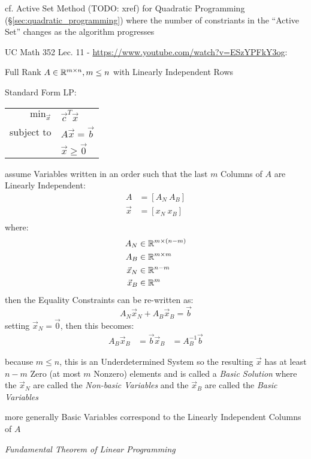 cf. Active Set Method (TODO: xref) for Quadratic Programming
(\S\ref{sec:quadratic_programming}) where the number of constriants in the
``Active Set'' changes as the algorithm progresses

UC Math 352 Lec. 11 - \url{https://www.youtube.com/watch?v=ESzYPFkY3og}:

Full Rank $A \in \mathbb{R}^{m \times n}, m \leq n$ with Linearly Independent Rows

Standard Form LP:

\begin{tabular}{r l}
  $\mathrm{min}_{\vec{x}}$ & $\vec{c}^T\vec{x}$     \\
  subject to               & $A\vec{x} = \vec{b}$   \\
                           & $\vec{x} \geq \vec{0}$ \\
\end{tabular}

assume Variables written in an order such that the last $m$ Columns of $A$ are
Linearly Independent:
\begin{align*}
  A       & = [A_N \ A_B] \\
  \vec{x} & = [x_N \ x_B] \\
\end{align*}
where:
\begin{align*}
  A_N       & \in \mathbb{R}^{m \times (n - m)} \\
  A_B       & \in \mathbb{R}^{m \times m} \\
  \vec{x}_N & \in \mathbb{R}^{n-m} \\
  \vec{x}_B & \in \mathbb{R}^m \\
\end{align*}
then the Equality Constraints can be re-written as:
\[
  A_N\vec{x}_N + A_B\vec{x}_B = \vec{b}
\]
setting $\vec{x}_N = \vec{0}$, then this becomes:
\begin{align*}
  A_B\vec{x}_B & = \vec{b}
  \vec{x}_B    & = A_B^{-1}\vec{b}
\end{align*}

because $m \leq n$, this is an Underdetermined System so the resulting
$\vec{x}$ has at least $n - m$ Zero (at most $m$ Nonzero) elements and is
called a \emph{Basic Solution} where the $\vec{x}_N$ are called the
\emph{Non-basic Variables} and the $\vec{x}_B$ are called the \emph{Basic
  Variables}

more generally Basic Variables correspond to the Linearly Independent Columns
of $A$

\emph{Fundamental Theorem of Linear Programming}

